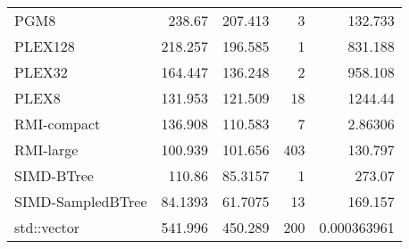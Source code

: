 \begin{tabular}{lrrrr}
 PGM8              &               238.67   &              207.413  &            3 &   132.733       \\
 PLEX128           &               218.257  &              196.585  &            1 &   831.188       \\
 PLEX32            &               164.447  &              136.248  &            2 &   958.108       \\
 PLEX8             &               131.953  &              121.509  &           18 &  1244.44        \\
 RMI-compact       &               136.908  &              110.583  &            7 &     2.86306     \\
 RMI-large         &               100.939  &              101.656  &          403 &   130.797       \\
 SIMD-BTree        &               110.86   &               85.3157 &            1 &   273.07        \\
 SIMD-SampledBTree &                84.1393 &               61.7075 &           13 &   169.157       \\
 std::vector       &               541.996  &              450.289  &          200 &     0.000363961 \\
\hline
\end{tabular}